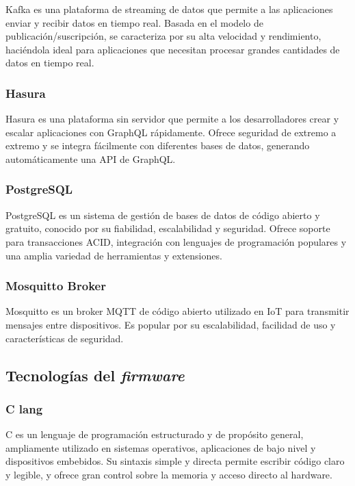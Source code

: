 Kafka \citep{kafka} es una plataforma de streaming de datos que permite a las aplicaciones enviar y recibir datos en tiempo real. Basada en el modelo de publicación/suscripción, se caracteriza por su alta velocidad y rendimiento, haciéndola ideal para aplicaciones que necesitan procesar grandes cantidades de datos en tiempo real.


\subsubsection{Hasura}

Hasura \citep{hasura} es una plataforma sin servidor que permite a los desarrolladores crear y escalar aplicaciones con GraphQL rápidamente. Ofrece seguridad de extremo a extremo y se integra fácilmente con diferentes bases de datos, generando automáticamente una API de GraphQL.


\subsubsection{PostgreSQL}

PostgreSQL \citep{postgresql} es un sistema de gestión de bases de datos de código abierto y gratuito, conocido por su fiabilidad, escalabilidad y seguridad. Ofrece soporte para transacciones ACID, integración con lenguajes de programación populares y una amplia variedad de herramientas y extensiones.


\subsubsection{Mosquitto Broker}

Mosquitto \citep{mosquitto} es un broker MQTT de código abierto utilizado en IoT para transmitir mensajes entre dispositivos. Es popular por su escalabilidad, facilidad de uso y características de seguridad.


\newpage
\subsection{Tecnologías del \textit{firmware}}


\subsubsection{C lang}

C \citep{c-lang} es un lenguaje de programación estructurado y de propósito general, ampliamente utilizado en sistemas operativos, aplicaciones de bajo nivel y dispositivos embebidos. Su sintaxis simple y directa permite escribir código claro y legible, y ofrece gran control sobre la memoria y acceso directo al hardware.


